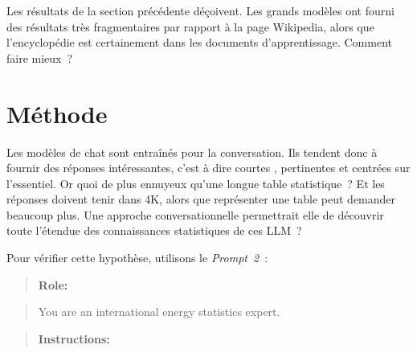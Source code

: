 \documentclass[a4paper,11pt]{report}
\begin{document}
Les résultats de la section précédente déçoivent. Les grands modèles ont fourni des résultats très fragmentaires par rapport à la page Wikipedia, alors que l'encyclopédie est certainement dans les documents d'apprentissage. Comment faire mieux~?

\section{Méthode}\label{muxe9thode}

Les modèles de chat sont entraînés pour la conversation. Ils tendent donc à fournir des réponses intéressantes, c'est à dire courtes , pertinentes et centrées sur l'essentiel. Or quoi de plus ennuyeux qu'une longue table statistique~? Et les réponses doivent tenir dans 4K, alors que représenter une table peut demander beaucoup plus. Une approche conversationnelle permettrait elle de découvrir toute l'étendue des connaissances statistiques de ces LLM~?

Pour vérifier cette hypothèse, utilisons le \emph{\emph{P}\emph{rompt~}\emph{2}}~:

\begin{quote}
\textbf{\textbf{Role:}}
\end{quote}

\begin{quote}
You are an international energy statistics expert.
\end{quote}

\begin{quote}
\textbf{\textbf{Instructions:}}
\end{quote}
\end{document}
